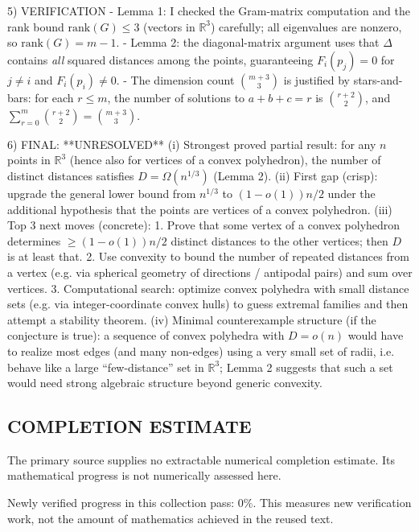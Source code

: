 5) VERIFICATION
- Lemma 1: I checked the Gram-matrix computation and the rank bound $\mathrm{rank}(G)\le 3$ (vectors in $\mathbb{R}^3$) carefully; all eigenvalues are nonzero, so $\mathrm{rank}(G)=m-1$.
- Lemma 2: the diagonal-matrix argument uses that $\Delta$ contains \emph{all} squared distances among the points, guaranteeing $F_i(p_j)=0$ for $j\neq i$ and $F_i(p_i)\neq 0$.
- The dimension count $\binom{m+3}{3}$ is justified by stars-and-bars: for each $r\le m$, the number of solutions to $a+b+c=r$ is $\binom{r+2}{2}$, and $\sum_{r=0}^m \binom{r+2}{2}=\binom{m+3}{3}$.

6) FINAL: **UNRESOLVED**
(i) Strongest proved partial result: for any $n$ points in $\mathbb{R}^3$ (hence also for vertices of a convex polyhedron), the number of distinct distances satisfies $D=\Omega(n^{1/3})$ (Lemma 2).
(ii) First gap (crisp): upgrade the general lower bound from $n^{1/3}$ to $(1-o(1))n/2$ under the additional hypothesis that the points are vertices of a convex polyhedron.
(iii) Top 3 next moves (concrete):
  1. Prove that some vertex of a convex polyhedron determines $\ge (1-o(1))n/2$ distinct distances to the other vertices; then $D$ is at least that.
  2. Use convexity to bound the number of repeated distances from a vertex (e.g. via spherical geometry of directions / antipodal pairs) and sum over vertices.
  3. Computational search: optimize convex polyhedra with small distance sets (e.g. via integer-coordinate convex hulls) to guess extremal families and then attempt a stability theorem.
(iv) Minimal counterexample structure (if the conjecture is true): a sequence of convex polyhedra with $D=o(n)$ would have to realize most edges (and many non-edges) using a very small set of radii, i.e. behave like a large ``few-distance'' set in $\mathbb{R}^3$; Lemma 2 suggests that such a set would need strong algebraic structure beyond generic convexity.


\subsection*{COMPLETION ESTIMATE}
The primary source supplies no extractable numerical completion estimate. Its mathematical progress is not numerically assessed here.

Newly verified progress in this collection pass: $0\%$. This measures new verification work, not the amount of mathematics achieved in the reused text.
